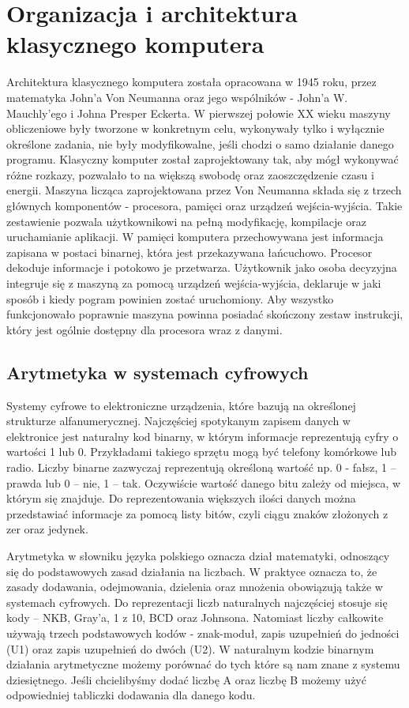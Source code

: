 \documentclass[12pt, a4paper, onside, polish]{article}				%
\begin{document}
\section{Organizacja i architektura klasycznego komputera}
\hspace{\parindent}
Architektura klasycznego komputera została opracowana w 1945 roku, przez matematyka John’a Von Neumanna oraz jego wspólników - John’a W. Mauchly’ego i Johna Presper Eckerta. W pierwszej połowie XX wieku maszyny obliczeniowe były tworzone w konkretnym celu, wykonywały tylko i wyłącznie określone zadania, nie były modyfikowalne, jeśli chodzi o samo działanie danego programu. Klasyczny komputer został zaprojektowany tak, aby mógł wykonywać różne rozkazy, pozwalało to na większą swobodę oraz zaoszczędzenie czasu i energii. Maszyna licząca zaprojektowana przez Von Neumanna składa się z trzech głównych komponentów - procesora, pamięci oraz urządzeń wejścia-wyjścia. Takie zestawienie pozwala użytkownikowi na pełną modyfikację, kompilacje oraz uruchamianie aplikacji. W pamięci komputera przechowywana jest informacja zapisana w postaci binarnej, która jest przekazywana łańcuchowo. Procesor dekoduje informacje i potokowo je przetwarza. Użytkownik jako osoba decyzyjna integruje się z maszyną za pomocą urządzeń wejścia-wyjścia, deklaruje w jaki sposób i kiedy pogram powinien zostać uruchomiony. Aby wszystko funkcjonowało poprawnie maszyna powinna posiadać skończony zestaw instrukcji, który jest ogólnie dostępny dla procesora wraz z danymi. 
 
\subsection{Arytmetyka w systemach cyfrowych}
\hspace{\parindent}
Systemy cyfrowe to elektroniczne urządzenia, które bazują na określonej strukturze alfanumerycznej. Najczęściej spotykanym zapisem danych w elektronice jest naturalny kod binarny, w którym informacje reprezentują cyfry o wartości 1 lub 0.  Przykładami takiego sprzętu mogą być telefony komórkowe lub radio. Liczby binarne zazwyczaj reprezentują określoną wartość np. 0 - fałsz, 1 – prawda lub 0 – nie, 1 – tak. Oczywiście wartość danego bitu zależy od miejsca, w którym się znajduje. Do reprezentowania większych ilości danych można przedstawiać informacje za pomocą listy bitów, czyli ciągu znaków złożonych z zer oraz jedynek. 

Arytmetyka w słowniku języka polskiego oznacza dział matematyki, odnoszący się do podstawowych zasad działania na liczbach. W praktyce oznacza to, że zasady dodawania, odejmowania, dzielenia oraz mnożenia obowiązują także w systemach cyfrowych. Do reprezentacji liczb naturalnych najczęściej stosuje się kody – NKB, Gray’a, 1 z 10, BCD oraz Johnsona. Natomiast liczby całkowite używają trzech podstawowych kodów - znak-moduł, zapis uzupełnień do jedności (U1) oraz zapis uzupełnień do dwóch (U2). W naturalnym kodzie binarnym działania arytmetyczne możemy porównać do tych które są nam znane z systemu dziesiętnego. Jeśli chcielibyśmy dodać liczbę A oraz liczbę B możemy użyć odpowiedniej tabliczki dodawania dla danego kodu. 
\end{document}

